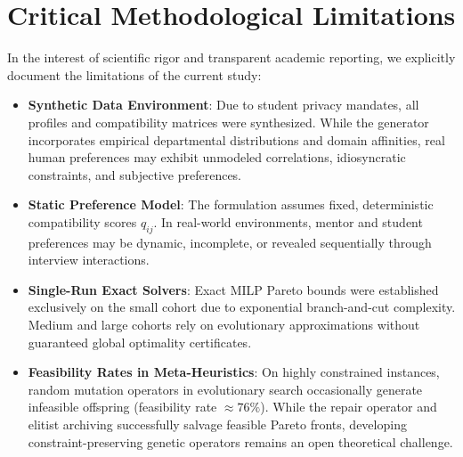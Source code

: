 \section{Critical Methodological Limitations}
In the interest of scientific rigor and transparent academic reporting, we explicitly document the limitations of the current study:
\begin{itemize}
    \item \textbf{Synthetic Data Environment}: Due to student privacy mandates, all profiles and compatibility matrices were synthesized. While the generator incorporates empirical departmental distributions and domain affinities, real human preferences may exhibit unmodeled correlations, idiosyncratic constraints, and subjective preferences.
    \item \textbf{Static Preference Model}: The formulation assumes fixed, deterministic compatibility scores $q_{ij}$. In real-world environments, mentor and student preferences may be dynamic, incomplete, or revealed sequentially through interview interactions.
    \item \textbf{Single-Run Exact Solvers}: Exact MILP Pareto bounds were established exclusively on the small cohort due to exponential branch-and-cut complexity. Medium and large cohorts rely on evolutionary approximations without guaranteed global optimality certificates.
    \item \textbf{Feasibility Rates in Meta-Heuristics}: On highly constrained instances, random mutation operators in evolutionary search occasionally generate infeasible offspring (feasibility rate $\approx 76\%$). While the repair operator and elitist archiving successfully salvage feasible Pareto fronts, developing constraint-preserving genetic operators remains an open theoretical challenge.
\end{itemize}

